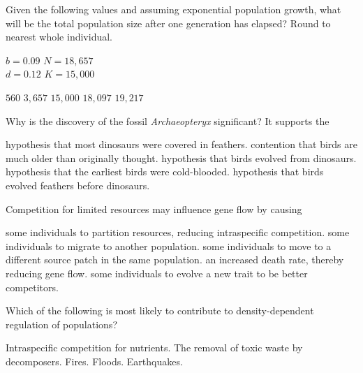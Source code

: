 \question
Given the following values and assuming exponential population growth, what will be the total population size after one generation has elapsed? Round to nearest whole individual.\vspace{1ex}

\hspace{\leftmargin}%
\begin{minipage}{2in}
$b = 0.09$ \qquad $N = 18,657$\\
$d = 0.12$ \qquad $K = 15,000$\\
\end{minipage}

\begin{choices}
\choice $560$ %
\choice $3,657$ %
\choice $15,000$ %
\correctchoice $18,097$ %
\choice $19,217$ %
\end{choices}

\question
Why is the discovery of the fossil \textit{Archaeopteryx} significant? It supports the  

\begin{choices}
\choice hypothesis that most dinosaurs were covered in feathers. 
\choice contention that birds are much older than originally thought. 
\correctchoice hypothesis that birds evolved from dinosaurs. 
\choice hypothesis that the earliest birds were cold-blooded. 
\choice hypothesis that birds evolved feathers before dinosaurs. 
\end{choices}

\question
Competition for limited resources may influence gene flow by causing

\begin{choices}
\choice  some individuals to partition resources, reducing intraspecific competition.
\correctchoice some individuals to migrate to another population.
\choice  some individuals to move to a different source patch in the same population.
\choice  an increased death rate, thereby reducing gene flow.
\choice  some individuals to evolve a new trait to be better competitors.
\end{choices}

\question
Which of the following is most likely to contribute to density-dependent regulation of populations?

\begin{choices}
\correctchoice Intraspecific competition for nutrients.
\choice The removal of toxic waste by decomposers.
\choice Fires.
\choice Floods.
\choice Earthquakes.
\end{choices}
